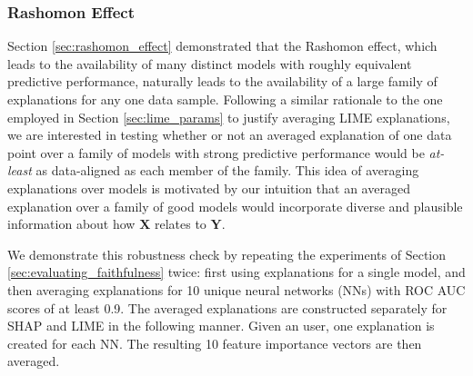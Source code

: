 \documentclass[mnsc,blindrev]{informs3}
\newcommand{\bX}{\mathbf{X}}
\newcommand{\bY}{\mathbf{Y}}
\begin{document}
            

            
       

        \subsubsection{Rashomon Effect}
           Section \ref{sec:rashomon_effect} demonstrated that the Rashomon effect, which leads to the availability of many distinct models with roughly equivalent predictive performance, naturally leads to the availability of a large family of explanations for any one data sample. 
           Following a similar rationale to the one employed in Section \ref{sec:lime_params} to justify averaging LIME explanations, we are interested in testing whether or not an averaged explanation of one data point over a family of models with strong predictive performance would be \emph{at-least} as data-aligned as each member of the family. This idea of averaging explanations over models is motivated by our intuition that an averaged explanation over a family of good models would incorporate diverse and plausible information about how $\bX$ relates to $\bY$.


            We demonstrate this robustness check by repeating the experiments of Section \ref{sec:evaluating_faithfulness} twice: first using explanations for a single model, and then averaging explanations for 10 unique neural networks (NNs) with ROC AUC scores of at least 0.9. The averaged explanations are constructed separately for SHAP and LIME in the following manner. Given an user, one explanation is created for each NN. The resulting 10 feature importance vectors are then averaged.%
             
\end{document}
